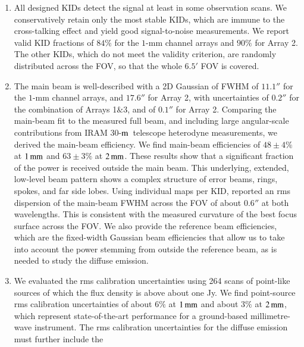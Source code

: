 \documentclass[traditionalabstract]{aa}
\newcommand{\trentemetre}{30-$\rm{m}$}
\newcommand{\lp}[1]{#1}
\newcommand{\rev}[1]{#1}
\begin{document}
{\begin{enumerate}
\item %
  All designed KIDs detect the
  signal at least in some observation
  scans. We conservatively retain only the most stable KIDs, which are
  immune to the cross-talking effect and yield good signal-to-noise
  measurements. 
  We report valid KID fractions of $84\%$
  for the $1$-mm channel arrays and $90\%$ for Array 2. The other
  KIDs, which do not meet the validity criterion, are randomly
  distributed across the FOV, so that the whole $6.5'$ FOV is
  covered.
  \vspace{1mm}
\item %
  The main beam is well-described with a 2D
  Gaussian of FWHM of $11.1''$ for the $1$-mm channel arrays,
  and $17.6''$ for Array 2, with uncertainties of $0.2''$ for the
  combination of Arrays 1$\&$3, and of $0.1''$ for Array 2.
  {\rev Comparing the main-beam fit to the measured full beam, and 
    including large angular-scale contributions from IRAM
    \trentemetre\ telescope heterodyne measurements, we derived the
  main-beam efficiency.}
  We find main-beam
  efficiencies of {\rev $48 \pm 4 \%$} at $1\,\rm{mm}$ and {\rev $63 \pm 3 \%$} at
  $2\,\rm{mm}$.
  {\lp These results show that a significant fraction of the power is received
    outside the main beam. This underlying,
    extended, low-level beam pattern shows a complex structure of error 
    beams, rings, spokes, {\rev and far side lobes}.}
  Using individual maps per KID, \citet{Adam2018} reported an rms
  dispersion of the main-beam FWHM across the FOV of about $0.6''$ at
  both wavelengths. This is consistent with the measured curvature of
  the best focus surface across the FOV. 
  {\lp We also provide the reference beam efficiencies, which are the
    fixed-width Gaussian beam efficiencies that allow us to take into
    account the power stemming from outside the reference beam, {\rev
      as is needed to study the diffuse emission.}} 
  \vspace{1mm}
\item %
  We evaluated the rms calibration uncertainties using 264 
  scans of {\rev point-like} sources of which the flux density is above about
  one Jy. We find {\rev point-source} rms calibration
  uncertainties of about $6\%$ at $1\,\rm{mm}$ and about $3\%$ at
  $2\,\rm{mm}$, which represent state-of-the-art performance for a
  ground-based millimetre-wave instrument. {\rev The rms calibration
    uncertainties for the diffuse emission must further include the
}
\end{enumerate}}
\end{document}
